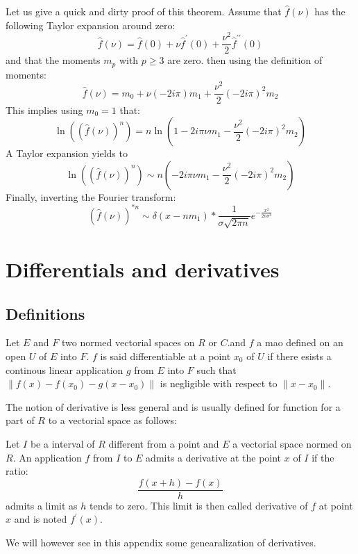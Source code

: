 \documentclass[12pt]{book}
\begin{document}
\begin{pf}
Let us give a quick and dirty proof of this theorem. Assume that
$\hat{f}(\nu)$ has 
the following Taylor expansion around zero:
\begin{equation}
\hat{f}(\nu)=\hat{f}(0)+\nu\hat{f}^{\prime}(0)+\frac{\nu^2}{2}\hat{f}^{\prime\prime}(0)
\end{equation}
and that the moments $m_p$ with $p\geq 3$ are zero. then using the definition
of moments:
\begin{equation}
\hat{f}(\nu)=m_0+\nu(-2i\pi )m_1+\frac{\nu^2}{2}(-2i\pi)^2m_2
\end{equation}
This implies using $m_0=1$ that:
\begin{equation}
\ln((\hat{f}(\nu))^n)=n\ln(1-2i\pi \nu m_1-\frac{\nu^2}{2}(-2i\pi)^2m_2)
\end{equation}
A Taylor expansion yields to
\begin{equation}
\ln((\hat{f}(\nu))^n)\sim n(-2i\pi \nu m_1-\frac{\nu^2}{2}(-2i\pi)^2m_2)
\end{equation}
Finally, inverting the Fourier transform:
\begin{equation}
(\hat{f}(\nu))^{*n}\sim \delta(x-nm_1)*\frac{1}{\sigma\sqrt{2\pi
n}}e^{-\frac{x^2}{2n \sigma^2}} 
\end{equation}
\end{pf}


\chapter{Differentials and derivatives}
\section{Definitions}
\begin{defn}
Let $E$ and $F$ two normed vectorial spaces on $R$ or $C$.and $f$ a
mao defined on an open $U$ of $E$ into $F$.
$f$ is said differentiable at a point $x_0$ of $U$ if there esists a
continous linear application $g$ from $E$ into $F$ such that
$\|f(x)-f(x_0)-g(x-x_0)\|$ is negligible with respect to $\|x-x_0\|$.
\end{defn}

The notion of derivative is less general and is usually defined for
function for a part of $R$ to a vectorial space as
follows:
\begin{defn}
Let $I$ be a interval of $R$ different from a point and $E$ a
vectorial space normed on $R$. An application $f$ from $I$ to $E$
admits a derivative at the point $x$ of $I$ if the ratio:
\begin{equation}
\frac{f(x+h)-f(x)}{h}
\end{equation}
admits a limit as $h$ tends to zero. This limit is then called
derivative of $f$ at point $x$ and is noted $f^\prime(x)$.
\end{defn}
We will however see in this appendix some genearalization of
derivatives.
\end{document}
